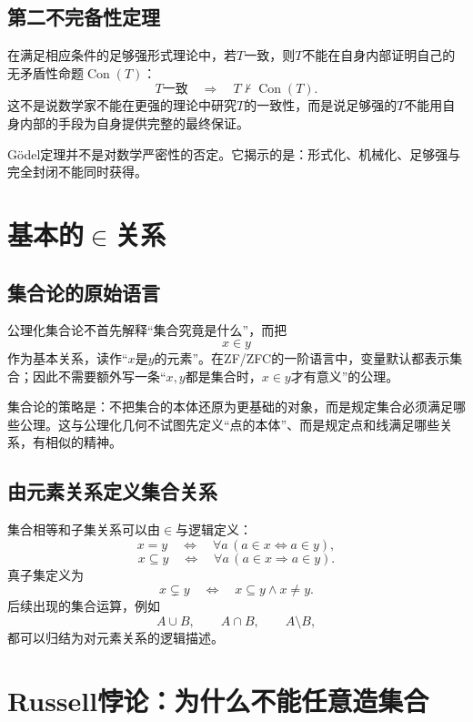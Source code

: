\subsection{第二不完备性定理}

在满足相应条件的足够强形式理论中，若$T$一致，则$T$不能在自身内部证明自己的无矛盾性命题$\operatorname{Con}(T)$：
\[
    T\text{一致}
    \quad\Longrightarrow\quad
    T\nvdash\operatorname{Con}(T).
\]
这不是说数学家不能在更强的理论中研究$T$的一致性，而是说足够强的$T$不能用自身内部的手段为自身提供完整的最终保证。

Gödel定理并不是对数学严密性的否定。它揭示的是：形式化、机械化、足够强与完全封闭不能同时获得。


\section{基本的\texorpdfstring{$\in$}{in}关系}

\subsection{集合论的原始语言}

公理化集合论不首先解释“集合究竟是什么”，而把
\[
    x\in y
\]
作为基本关系，读作“$x$是$y$的元素”。在ZF/ZFC的一阶语言中，变量默认都表示集合；因此不需要额外写一条“$x,y$都是集合时，$x\in y$才有意义”的公理。

集合论的策略是：不把集合的本体还原为更基础的对象，而是规定集合必须满足哪些公理。这与公理化几何不试图先定义“点的本体”、而是规定点和线满足哪些关系，有相似的精神。

\subsection{由元素关系定义集合关系}

集合相等和子集关系可以由$\in$与逻辑定义：
\[
    x=y
    \quad\Longleftrightarrow\quad
    \forall a\,(a\in x\Leftrightarrow a\in y),
\]
\[
    x\subseteq y
    \quad\Longleftrightarrow\quad
    \forall a\,(a\in x\Rightarrow a\in y).
\]
真子集定义为
\[
    x\subsetneq y
    \quad\Longleftrightarrow\quad
    x\subseteq y\land x\neq y.
\]
后续出现的集合运算，例如
\[
    A\cup B,
    \qquad
    A\cap B,
    \qquad
    A\setminus B,
\]
都可以归结为对元素关系的逻辑描述。


\section{Russell悖论：为什么不能任意造集合}

